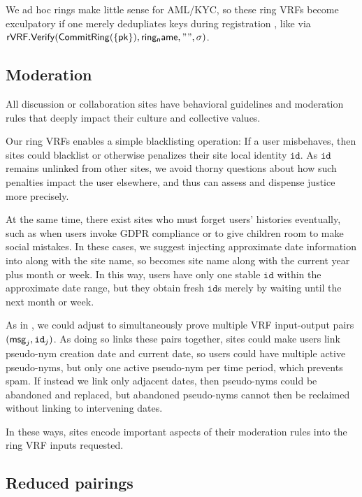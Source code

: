 We ad hoc rings make little sense for AML/KYC, so these ring VRFs become
exculpatory if one merely dedupliates keys during registration , like via
${\mathsf{rVRF}}.{\mathsf{Verify}}({\mathsf{CommitRing}}(\{\mathsf{pk}\}),\mathsf{ring_name},\mathtt{""},\sigma)$.


\subsection{Moderation}
\label{subsec:moderation}

All discussion or collaboration sites have behavioral guidelines and
moderation rules that deeply impact their culture and collective values.

Our ring VRFs enables a simple blacklisting operation:
If a user misbehaves, then sites could blacklist or otherwise penalizes
their site local identity $\mathtt{id}$.
As $\mathtt{id}$ remains unlinked from other sites, we avoid thorny
questions about how such penalties impact the user elsewhere, and thus
can assess and dispense justice more precisely. 

At the same time, there exist sites who must forget users' histories
eventually, such as when users invoke GDPR compliance or to give children
room to make social mistakes.  In these cases, we suggest injecting
approximate date information into \msg along with the site name,
so \msg becomes site name along with the current year plus month or week.
In this way, users have only one stable $\mathtt{id}$ within the
approximate date range, but they obtain fresh $\mathtt{id}$s merely
by waiting until the next month or week.

As in \cite{PrivacyPass}, we could adjust \PedVRF to simultaneously
prove multiple VRF input-output pairs $(\mathsf{msg}_j,\mathtt{id}_j)$.
As doing so links these pairs together, sites could make users link
pseudo-nym creation date and current date, so users could have multiple
active pseudo-nyms, but only one active pseudo-nym per time period,
which prevents spam.
If instead we link only adjacent dates, then pseudo-nyms could
be abandoned and replaced, but abandoned pseudo-nyms cannot then
be reclaimed without linking to intervening dates.

In these ways, sites encode important aspects of their moderation rules
into the ring VRF inputs requested.  


\subsection{Reduced pairings}
\label{sec:reduced_pairings}

